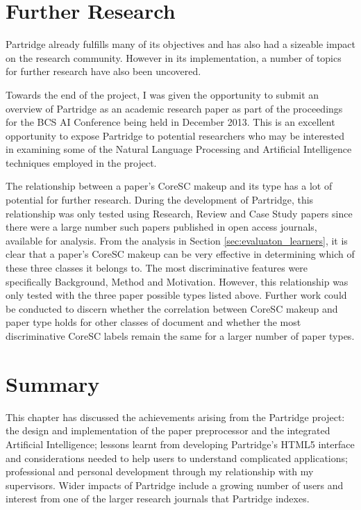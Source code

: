 \section{ Further Research }

Partridge already fulfills many of its objectives and has also had a sizeable
impact on the research community. However in its implementation, a number of
topics for further research have also been uncovered.

Towards the end of the project, I was given the opportunity to submit an
overview of Partridge as an academic research paper as part of the proceedings
for the BCS AI Conference being held in December 2013. This is an excellent
opportunity to expose Partridge to potential researchers who may be interested
in examining some of the Natural Language Processing and Artificial
Intelligence techniques employed in the project.

The relationship between a paper's  CoreSC makeup and its type has a lot of
potential for further research. During the development of Partridge, this
relationship was only tested using Research, Review and Case Study papers since
there were a large number such papers published in open access journals,
available for analysis. From the analysis in Section
\ref{sec:evaluaton_learners}, it is clear that a paper's CoreSC makeup can be
very effective in determining which of these three classes it belongs to. The
most discriminative features were specifically Background, Method and
Motivation. However, this relationship was only tested with the three paper
possible types listed above. Further work could be conducted to discern whether
the correlation between CoreSC makeup and paper type holds for other classes of
document and whether the most discriminative CoreSC labels remain the same for
a larger number of paper types.

\section{ Summary }

This chapter has discussed the achievements arising from the Partridge project:
the design and implementation of the paper preprocessor and the integrated
Artificial Intelligence; lessons learnt from developing Partridge's HTML5
interface and considerations needed to help users to understand complicated
applications; professional and personal development through my relationship
with my supervisors. Wider impacts of Partridge include a growing number of
users and interest from one of the larger research journals that Partridge
indexes.

